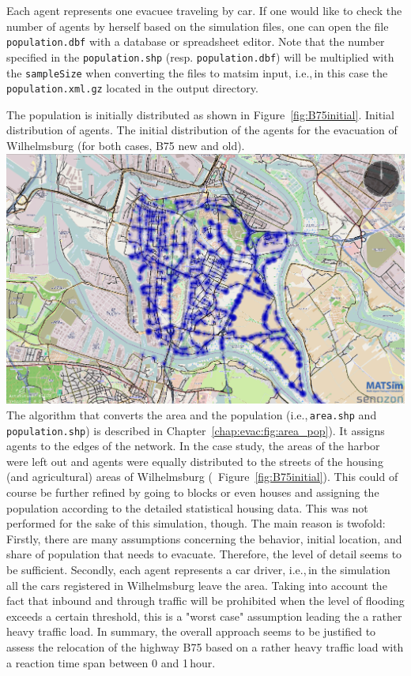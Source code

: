Each agent represents one evacuee traveling by car. If one would like to check the number of agents by herself based on the simulation files, one can open the file \lstinline|population.dbf| with a database or spreadsheet editor. Note that the number specified in the \lstinline|population.shp| (resp. \lstinline|population.dbf|) will be multiplied with the \lstinline|sampleSize| when converting the files to \gls{matsim} input, i.e.,\,in this case the \lstinline|population.xml.gz| located in the output directory.

The population is initially distributed as shown in Figure~\ref{fig:B75initial}. 
%
\createfigure%
{Initial distribution of agents.}%
{The initial distribution of the agents for the evacuation of Wilhelmsburg (for both cases, B75 new and old).}%
{\label{fig:B75initial}}%
{\includegraphics[width=0.7\linewidth]{using/figures/B75initial}}%
{}
The algorithm that converts the area and the population (i.e.,\,\lstinline|area.shp| and \lstinline|population.shp|) is described in Chapter~\ref{chap:evac:fig:area_pop}). It assigns agents to the edges of the network. In the case study, the areas of the harbor were left out and agents were equally distributed to the streets of the housing (and agricultural) areas of Wilhelmsburg (\ Figure~\ref{fig:B75initial}).
This could of course be further refined by going to blocks or even houses and assigning the population according to the detailed statistical housing data. This was not performed for the sake of this simulation, though. The main reason is twofold: Firstly, there are many assumptions concerning the behavior, initial location, and share of population that needs to evacuate. Therefore, the level of detail seems to be sufficient. Secondly, each agent represents a car driver, i.e.,\,in the simulation all the cars registered in Wilhelmsburg leave the area. Taking into account the fact that inbound and through traffic will be prohibited when the level of flooding exceeds a certain threshold, this is a "worst case" assumption leading the a rather heavy traffic load. In summary, the overall approach seems to be justified to assess the relocation of the highway B75 based on a rather heavy traffic load with a reaction time span between 0 and 1\,hour.

